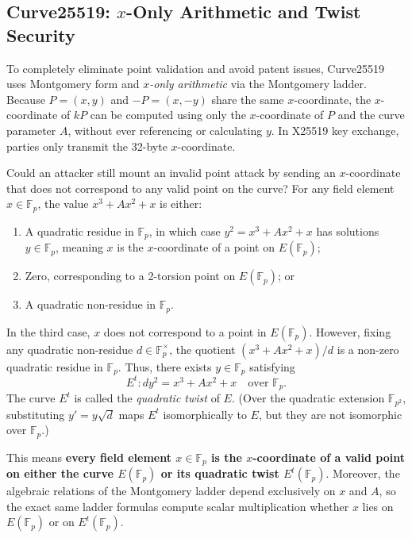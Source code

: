 \subsection*{Curve25519: $x$-Only Arithmetic and Twist Security}

To completely eliminate point validation and avoid patent issues, Curve25519 uses Montgomery form and \emph{\(x\)-only arithmetic} via the Montgomery ladder.
Because \(P = (x, y)\) and \(-P = (x, -y)\) share the same \(x\)-coordinate, the \(x\)-coordinate of \(k P\) can be computed using only the \(x\)-coordinate of \(P\) and the curve parameter \(A\), without ever referencing or calculating \(y\).
In X25519 key exchange, parties only transmit the 32-byte \(x\)-coordinate.

Could an attacker still mount an invalid point attack by sending an \(x\)-coordinate that does not correspond to any valid point on the curve?
For any field element \(x \in \mathbb{F}_p\), the value \(x^3 + Ax^2 + x\) is either:
\begin{enumerate}
    \item A quadratic residue in \(\mathbb{F}_p\), in which case \(y^2 = x^3 + Ax^2 + x\) has solutions \(y \in \mathbb{F}_p\), meaning \(x\) is the \(x\)-coordinate of a point on \(E(\mathbb{F}_p)\);
    \item Zero, corresponding to a 2-torsion point on \(E(\mathbb{F}_p)\); or
    \item A quadratic non-residue in \(\mathbb{F}_p\).
\end{enumerate}
In the third case, \(x\) does not correspond to a point in \(E(\mathbb{F}_p)\).
However, fixing any quadratic non-residue \(d \in \mathbb{F}_p^\times\), the quotient \((x^3 + Ax^2 + x)/d\) is a non-zero quadratic residue in \(\mathbb{F}_p\).
Thus, there exists \(y \in \mathbb{F}_p\) satisfying
\[
    E^t: d y^2 = x^3 + Ax^2 + x \quad \text{over } \mathbb{F}_p.
\]
The curve \(E^t\) is called the \emph{quadratic twist} of \(E\).
(Over the quadratic extension \(\mathbb{F}_{p^2}\), substituting \(y' = y \sqrt{d}\) maps \(E^t\) isomorphically to \(E\), but they are not isomorphic over \(\mathbb{F}_p\).)

This means \textbf{every field element \(x \in \mathbb{F}_p\) is the \(x\)-coordinate of a valid point on either the curve \(E(\mathbb{F}_p)\) or its quadratic twist \(E^t(\mathbb{F}_p)\)}.
Moreover, the algebraic relations of the Montgomery ladder depend exclusively on \(x\) and \(A\), so the exact same ladder formulas compute scalar multiplication whether \(x\) lies on \(E(\mathbb{F}_p)\) or on \(E^t(\mathbb{F}_p)\).

